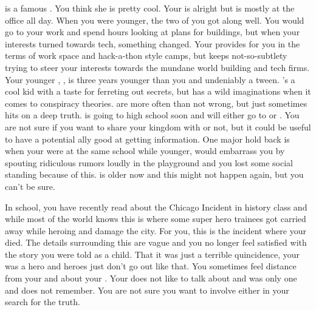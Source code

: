 \documentclass[char]{LRSguildcamp1}
\begin{document}
\cGrandma{} is a famous \cGrandma{\villain}. You think she is pretty cool. Your \cArchitect{\parent} is alright but is mostly at the office all day. When you were younger, the two of you got along well. You would go to your \cArchitect{\parent} work and spend hours looking at plans for buildings, but when your interests turned towards tech, something changed. Your \cArchitect{\parent} provides for you in the terms of work space and hack-a-thon style camps, but keeps not-so-subtlety trying to steer your interests towards the mundane world building and tech firms. Your younger \cTween{\sibling}, \cTween{}, is three years younger than you and undeniably a tween. \cTween{}'s a cool kid with a taste for ferreting out secrets, but has a wild imaginations when it comes to conspiracy theories. \cTween{\They} are more often than not wrong, but just sometimes hits on a deep truth. \cTween{} is going to high school soon and will either go to \pNormalSchool{} or \pSuperSchool{}. You are not sure if you want to share your kingdom with \cTween{\them} or not, but it could be useful to have a potential ally good at getting information. One major hold back is when your were at the same school while younger, \cTween{} would embarrass you by spouting ridiculous rumors loudly in the playground and you lost some social standing because of this. \cTween{} is older now and this might not happen again, but you can't be sure. 

In school, you have recently read about the Chicago Incident in history class and while most of the world knows this is where some super hero trainees got carried away while heroing and damage the city. For you, this is the incident where your \cAS{\parent} died. The details surrounding this are vague and you no longer feel satisfied with the story you were told as a child. That it was just a terrible quincidence, your \cAS{} was a hero and heroes just don't go out like that. You sometimes feel distance from your\cArchitect{\parent} and \cTween{} about your \cAS{\parent}. Your \cArchitect{\parent} does not like to talk about \cAS{} and \cTween{} was only one and does not remember. You are not sure you want to involve either in your search for the truth.
\end{document}
